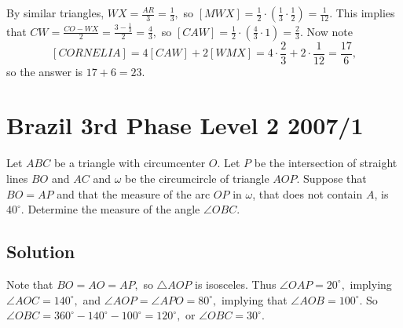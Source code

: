 \documentclass{article}
\begin{document}
By similar triangles, $WX=\frac{AR}{3}=\frac{1}{3},$ so $[MWX]=\frac{1}{2}\cdot (\frac{1}{3}\cdot \frac{1}{2})=\frac{1}{12}.$ This implies that $CW=\frac{CO-WX}{2}=\frac{3-\frac{1}{3}}{2}=\frac{4}{3},$ so $[CAW]=\frac{1}{2}\cdot (\frac{4}{3}\cdot 1)=\frac{2}{3}.$ Now note
\[[CORNELIA]=4[CAW]+2[WMX]=4\cdot \frac{2}{3}+2\cdot\frac{1}{12}=\frac{17}{6},\]
so the answer is $17+6=23.$

\begin{center}
\end{center}

\pagebreak\section{Brazil 3rd Phase Level 2 2007/1}

Let $ABC$ be a triangle with circumcenter $O$. Let $P$ be the intersection of straight lines $BO$ and $AC$ and $\omega$ be the circumcircle of triangle $AOP$. Suppose that $BO = AP$ and that the measure of the arc $OP$ in $\omega$, that does not contain $A$, is $40^{\circ}$. Determine the measure of the angle $\angle OBC$.

\subsection{Solution}

Note that $BO=AO=AP,$ so $\triangle AOP$ is isosceles. Thus $\angle OAP=20^{\circ},$ implying $\angle AOC=140^{\circ},$ and $\angle AOP=\angle APO=80^{\circ},$ implying that $\angle AOB=100^{\circ}.$ So $\angle OBC=360^{\circ}-140^{\circ}-100^{\circ}=120^{\circ},$ or $\angle OBC=30^{\circ}.$
    
\end{document}
